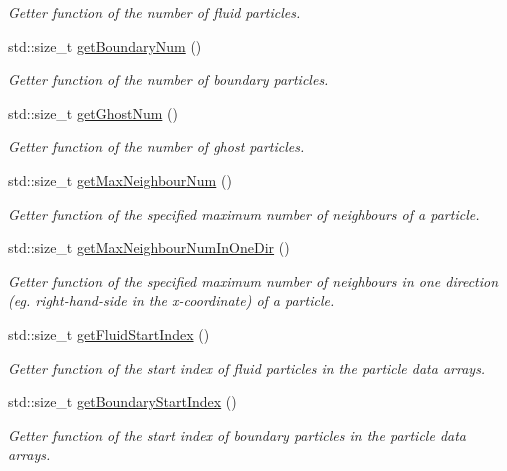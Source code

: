 \begin{DoxyCompactItemize}
\begin{DoxyCompactList}\small\item\em Getter function of the number of {\itshape fluid} particles. \end{DoxyCompactList}\item 
std\-::size\-\_\-t \hyperlink{classParticleData_ac333d486010c5990b8dda9bb39a084e4}{get\-Boundary\-Num} ()
\begin{DoxyCompactList}\small\item\em Getter function of the number of {\itshape boundary} particles. \end{DoxyCompactList}\item 
std\-::size\-\_\-t \hyperlink{classParticleData_a4f2840f8c303db330bcbb9310e42b63a}{get\-Ghost\-Num} ()
\begin{DoxyCompactList}\small\item\em Getter function of the number of {\itshape ghost} particles. \end{DoxyCompactList}\item 
std\-::size\-\_\-t \hyperlink{classParticleData_aaed390a75982301dd2d0f9e7548f429f}{get\-Max\-Neighbour\-Num} ()
\begin{DoxyCompactList}\small\item\em Getter function of the specified maximum number of neighbours of a particle. \end{DoxyCompactList}\item 
std\-::size\-\_\-t \hyperlink{classParticleData_ae4cb9eaa2b370db71bb411b69460ae88}{get\-Max\-Neighbour\-Num\-In\-One\-Dir} ()
\begin{DoxyCompactList}\small\item\em Getter function of the specified maximum number of neighbours in one direction (eg. right-\/hand-\/side in the x-\/coordinate) of a particle. \end{DoxyCompactList}\item 
std\-::size\-\_\-t \hyperlink{classParticleData_aeef5d282d6a0d4b994ebb6c9adf2e732}{get\-Fluid\-Start\-Index} ()
\begin{DoxyCompactList}\small\item\em Getter function of the start index of fluid particles in the particle data arrays. \end{DoxyCompactList}\item 
std\-::size\-\_\-t \hyperlink{classParticleData_a474f208bd625a6cb5f7d07ee182b88fd}{get\-Boundary\-Start\-Index} ()
\begin{DoxyCompactList}\small\item\em Getter function of the start index of boundary particles in the particle data arrays. \end{DoxyCompactList}\item 

\end{DoxyCompactItemize}
